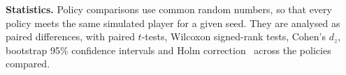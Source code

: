 \noindent\textbf{Statistics.} Policy comparisons use common random numbers, so that every policy meets
the same simulated player for a given seed. They are analysed as paired differences, with paired
$t$-tests, Wilcoxon signed-rank tests, Cohen's $d_z$, bootstrap 95\% confidence intervals and Holm
correction~\cite{holm1979simple} across the policies compared.
